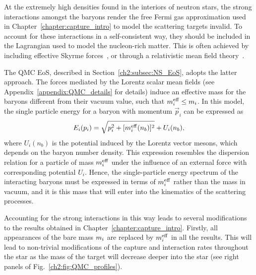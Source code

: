 At the extremely high densities found in the interiors of neutron stars, the strong interactions amongst the baryons render the free Fermi gas approximation used in Chapter~\ref{chapter:capture_intro} to model the scattering targets invalid. To account for these interactions in a self-consistent way, they should be included in the Lagrangian used to model the nucleon-rich matter. This is often achieved by including effective Skyrme forces~\cite{Bender:2003jk_Selfconsistentmeanfieldmodels, Stone:2006fn_Skyrmeinteractionfinite}, or through a relativistic mean field theory~\cite{Bender:2003jk_Selfconsistentmeanfieldmodels, Guichon:2018uew_QuarkMesonCouplingQMC}.

The QMC EoS, described in Section~\ref{ch2:subsec:NS_EoS}, adopts the latter approach. The forces mediated by the Lorentz scalar mean fields (see Appendix~\ref{appendix:QMC_details} for details) induce an effective mass for the baryons different from their vacuum value, such that $m_i^{\rm eff} \leq m_i$. In this model, the single particle energy for a baryon with momentum $\vec{p}_i$ can be expressed as
\begin{equation}
   E_i(p_i) = \sqrt{p_i^2 + [m_i^{\rm eff}(n_b)]^2} + U_i(n_b),
   \label{ch5:eq:total_energy}
\end{equation}
where $U_i(n_b)$ is the potential induced by the Lorentz vector mesons, which depends on the baryon number density. This expression resembles the dispersion relation for a particle of mass $m_i^{\rm eff}$ under the influence of an external force with corresponding potential $U_i$. Hence, the single-particle energy spectrum of the interacting baryons must be expressed in terms of $m_i^{\rm eff}$ rather than the mass in vacuum, and it is this mass that will enter into the kinematics of the scattering processes.  

Accounting for the strong interactions in this way leads to several modifications to the results obtained in Chapter~\ref{chapter:capture_intro}. Firstly, all appearances of the bare mass $m_i$ are replaced by $m_i^{\rm eff}$ in all the results. This will lead to non-trivial modifications of the capture and interaction rates throughout the star as the mass of the target will decrease deeper into the star (see right panels of Fig.~\ref{ch2:fig:QMC_profiles}).

